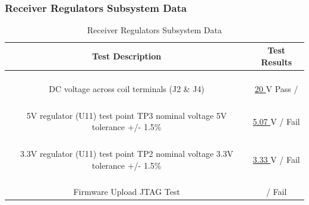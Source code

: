 \documentclass[12pt]{article}
\begin{document}
\hfill \\
\pagebreak

\subsubsection{Receiver Regulators Subsystem Data}
\hfill
\begin{table}[h!]
\centering
\caption*{Receiver Regulators Subsystem Data}
\begin{tabular}{ | c | c | }
\hline
\textbf{Test Description} & \textbf{Test Results} \\
\hline
\parbox{0.5\linewidth}{\raggedright \hfill \\[-0.25 em]
DC voltage across coil terminals (J2 \& J4)
 \hfill \\[0.1 em]} &  \parbox{0.4\linewidth}{\raggedright \hfill \\ [0.7 em]\underline{\hspace{0.125in}
20
\hspace{0.125in}} V  \hspace{0.125 in}Pass \space / \space {} \hfill \\ [0.3 em]} \\
\hline
\parbox{0.5\linewidth}{\raggedright \hfill \\[-0.25 em]
5V regulator (U11) test point TP3 nominal voltage 5V  tolerance +/- 1.5\%
\hfill \\[0.1 em]} &  \parbox{0.4\linewidth}{\raggedright \hfill \\ [0.7 em]\underline{\hspace{0.125in}
5.07
\hspace{0.125in}} V  \hspace{0.125 in} \space / \space  Fail \hfill \\ [0.3 em]} \\
\hline
\parbox{0.5\linewidth}{\raggedright \hfill \\[-0.25 em]
3.3V regulator (U11) test point TP2 nominal voltage 3.3V  tolerance +/- 1.5\%
\hfill \\[0.1 em]} &  \parbox{0.4\linewidth}{\raggedright \hfill \\ [0.7 em]\underline{\hspace{0.125in}
3.33
\hspace{0.125in}} V  \hspace{0.125 in} \space / \space  Fail \hfill \\ [0.3 em]} \\ 
\hline
\parbox{0.5\linewidth}{\raggedright \hfill \\[-0.25 em]
Firmware Upload JTAG Test\hfill \\[0.1 em]
} &  \parbox{0.4\linewidth}{\centering \hfill \\ [0.7 em]
\hspace{0.125 in} / \space  Fail \hfill \\ [0.3 em]} \\ 
\hline
\end{tabular}
\end{table}
\hfill \\
\end{document}
